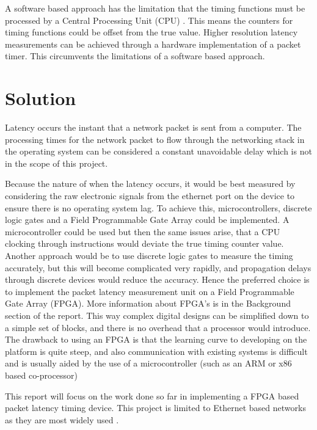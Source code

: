 \par A software based approach has the limitation that the timing functions must be processed by a
Central Processing Unit (CPU) \cite{CPUtiming}. This means the counters for timing functions could be offset from the true value. Higher
resolution latency measurements can be achieved through a hardware implementation of a packet
timer. This circumvents the limitations of a software based approach.

\section{Solution}

Latency occurs the instant that a network packet is sent from a computer. The processing times for the network packet
to flow through the networking stack in the operating system can be considered a constant unavoidable delay which is
not in the scope of this project.

Because the nature of when the latency occurs, it would be best measured by considering the raw electronic signals 
from the ethernet port on the device to ensure there is no operating system lag. To achieve this, microcontrollers, 
discrete logic gates and a Field Programmable Gate Array could be implemented. A microcontroller could be used but 
then the same issues arise, that a CPU clocking through instructions would deviate the true timing counter value. 
Another approach would be to use discrete logic gates to measure the timing accurately, but this will become 
complicated very rapidly, and propagation delays through discrete devices would reduce the accuracy. Hence the 
preferred choice is to implement the packet latency measurement unit on a Field Programmable Gate Array (FPGA). More 
information about FPGA’s is in the Background section of the report. This way complex digital designs can be 
simplified down to a simple set of blocks, and there is no overhead that a processor would introduce. The drawback 
to using an FPGA is that the learning curve to developing on the platform is quite steep, and also communication 
with existing systems is difficult and is usually aided by the use of a microcontroller (such as an ARM or x86 based 
co-processor)

\par This report will focus on the work done so far in implementing a FPGA based packet latency timing
device. This project is limited to Ethernet based networks as they are most widely used \cite{etherneteverywhere}.
